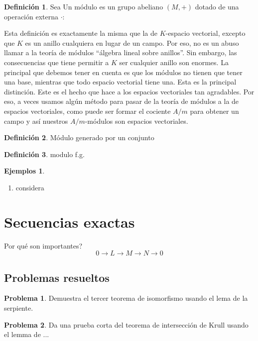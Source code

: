 \documentclass[b5paper,10pt]{book}
\theoremstyle{definition}
\newtheorem{defi}{Definición}
\newtheorem{problema}{Problema}
\newtheorem{ej}{Ejemplos}
\begin{document}
\begin{defi}
Sea 
Un módulo es un grupo abeliano \((M,+)\) dotado de una operación externa
\(\cdot: 	\)
\end{defi}

Esta definición es exactamente la misma que la de \(K\)-espacio vectorial,
excepto que \(K\) es un anillo cualquiera en lugar de un campo.
Por eso, no es un abuso llamar a la teoría de módulos 
``álgebra lineal sobre anillos''.
Sin embargo, 
las consecuencias que tiene permitir a \(K\) ser cualquier anillo
son enormes.
La principal que debemos tener en cuenta es que 
los módulos no tienen que tener una base, mientras
que todo espacio vectorial tiene una.
Esta es la principal distinción.
Este es el hecho que hace a los espacios vectoriales tan agradables.
Por eso, a veces usamos algún método
para pasar de la teoría de módulos a la de
espacios vectoriales, como puede ser 
formar el cociente \(A/m\) para obtener un campo
y así nuestros \(A/m\)-módulos son espacios vectoriales.

\begin{defi}
Módulo generado por un conjunto
\end{defi}

\begin{defi}
modulo f.g.
\end{defi}

\begin{ej}
\begin{enumerate}[label=(i)]
	\item considera
\end{enumerate}
\end{ej}

\section{Secuencias exactas}

Por qué son importantes?
\[
0\to L \to M\to N\to 0
\]

\subsection{Problemas resueltos}

\begin{problema}
Demuestra el tercer teorema de isomorfismo usando el lema de la serpiente.
\end{problema}

\begin{problema}
Da una prueba corta del teorema de intersección de Krull usando el
lemma de ... 
\end{problema}
\end{document}

